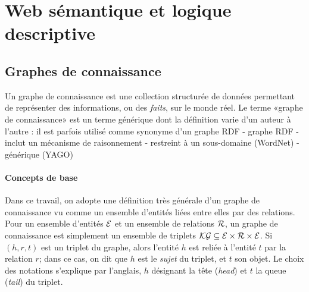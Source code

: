 \label{chap:revue}


\section{Web sémantique et logique descriptive}
\label{sec:dl}

\subsection{Graphes de connaissance}





Un graphe de connaissance est une collection structurée de données permettant de représenter des informations, ou des \textit{faits}, sur le monde réel. Le terme «graphe de connaissance» est un terme générique dont la définition varie d'un auteur à l'autre \cite{ehrlinger2016towards} : il est parfois utilisé comme synonyme d'un graphe RDF
- graphe RDF
- inclut un mécanisme de raisonnement
- restreint à un sous-domaine (WordNet)
- générique (YAGO)



\paragraph{Concepts de base}

Dans ce travail, on adopte une définition très générale d'un graphe de connaissance vu comme un ensemble d'entités liées entre elles par des relations. Pour un ensemble d'entités $\mathcal{E}$ et un ensemble de relations $\mathcal{R}$, un graphe de connaissance est simplement un ensemble de triplets $\mathcal{KG} \subseteq \mathcal{E} \times \mathcal{R} \times \mathcal{E}$. Si $(h, r, t)$ est un triplet du graphe, alors l'entité $h$ est reliée à l'entité $t$ par la relation $r$; dans ce cas, on dit que $h$ est le \textit{sujet} du triplet, et $t$ son objet. Le choix des notations s'explique par l'anglais, $h$ désignant la tête (\textit{head}) et $t$ la queue (\textit{tail}) du triplet. 

